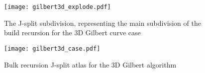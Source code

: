 \begin{figure}[h]
  \centering
  \texttt{[image: gilbert3d\_explode.pdf]}
  \caption{ The J-split subdivision, representing the main subdivision of the build recursion for the 3D Gilbert curve case }
  \label{fig:gilbert3DJSplit}
\end{figure}


\begin{figure*}[ht]
  \centering
  \texttt{[image: gilbert3d\_case.pdf]}
  \caption{ Bulk recursion J-split atlas for the 3D Gilbert algorithm }
  \label{fig:gilbert3DCase}
\end{figure*}



